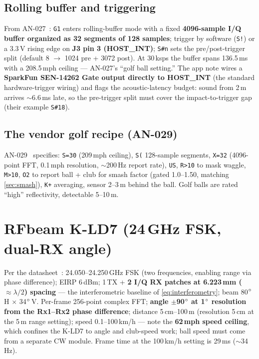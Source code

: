\subsection{Rolling buffer and triggering}
From AN-027~\cite{an027}: \texttt{G1} enters rolling-buffer mode with a
fixed \textbf{4096-sample I/Q buffer organized as 32 segments of 128
samples}; trigger by software (\texttt{S!}) or a 3.3\,V rising edge on
\textbf{J3 pin 3 (HOST\_INT)}; \texttt{S\#n} sets the pre/post-trigger
split (default 8 $\to$ 1024 pre + 3072 post). At 30\,ksps
the buffer spans 136.5\,ms with a 208.5\,mph ceiling --- AN-027's
``golf ball setting.'' The app note wires a \textbf{SparkFun SEN-14262
Gate output directly to HOST\_INT} (the standard hardware-trigger wiring) and
flags the acoustic-latency budget: sound from 2\,m arrives
$\sim$6.6\,ms late, so the pre-trigger split must cover the
impact-to-trigger gap (their example \texttt{S\#18}).

\subsection{The vendor golf recipe (AN-029)}
AN-029~\cite{an029} specifies: \texttt{S=30} (209\,mph ceiling),
\texttt{S(} 128-sample segments, \texttt{X=32} (4096-point FFT,
0.1\,mph resolution, $\sim$200\,Hz report rate), \texttt{US},
\texttt{R>10} to mask waggle, \texttt{M>10}, \texttt{O2} to report
ball + club for smash factor (gated 1.0--1.50, matching
\cref{sec:smash}), \texttt{K+} averaging, sensor 2--3\,m behind the
ball. Golf balls are rated ``high'' reflectivity, detectable 5--10\,m.

\section{RFbeam K-LD7 (24\,GHz FSK, dual-RX angle)}

Per the datasheet~\cite{kld7}: 24.050--24.250\,GHz FSK (two
frequencies, enabling range via phase difference); EIRP 6\,dBm; 1\,TX +
\textbf{2 I/Q RX patches at 6.223\,mm ($\approx\lambda/2$) spacing} ---
the interferometric baseline of \cref{eq:interferometry}; beam
80$\si{\degree}$\,H $\times$ 34$\si{\degree}$\,V. Per-frame 256-point complex FFT;
\textbf{angle $\pm$90$\si{\degree}$ at 1$\si{\degree}$ resolution from the
Rx1--Rx2 phase difference}; distance 5\,cm--100\,m (resolution 5\,cm at
the 5\,m range setting); speed 0.1--100\,km/h --- note the
\textbf{62\,mph speed ceiling}, which confines the K-LD7 to angle and
club-speed work; ball speed must come from a separate CW module. Frame time at
the 100\,km/h setting is 29\,ms ($\sim$34\,Hz).


